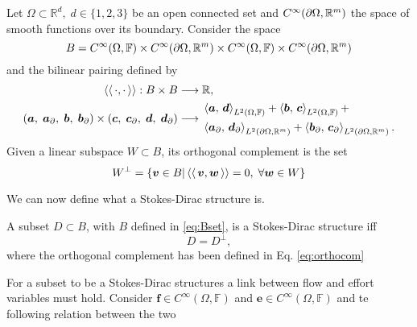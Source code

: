 \begin{definition}
Let $\Omega \subset \mathbb{R}^d, \; d \in \{1,2,3\}$ be an open connected set and $C^\infty(\partial\Omega, \bbR^m)$ the space of smooth functions over its boundary. Consider the space 
\begin{equation}\label{eq:Bset}
B = C^\infty(\Omega, \bbF) \times C^\infty(\partial\Omega, \bbR^m) \times C^\infty(\Omega, \bbF) \times C^\infty(\partial\Omega, \bbR^m)
\end{equation} 
and the bilinear pairing defined by
\begin{equation}\label{eq:bilprod}
\begin{aligned}
\bilprod{\cdot}{\cdot}: B \times B &\longrightarrow \bbR, \\
(\bm{a}, \; \bm{a}_\partial, \; \bm{b}, \; \bm{b}_\partial) \times (\bm{c}, \; \bm{c}_\partial, \; \bm{d}, \; \bm{d}_\partial) &\longrightarrow 
\begin{aligned}
&\inner[L^2(\Omega, \mathbb{F})]{\bm{a}}{\bm{d}} + \inner[L^2(\Omega, \mathbb{F})]{\bm{b}}{\bm{c}} + \\
&\inner[L^2(\partial\Omega, \bbR^m)]{\bm{a}_\partial}{\bm{d}_\partial} +\inner[L^2(\partial\Omega, \bbR^m)]{\bm{b}_\partial}{\bm{c}_\partial}.
\end{aligned}
\end{aligned}
\end{equation}
Given a linear subspace $W \subset B$, its orthogonal complement is the set
\begin{equation}\label{eq:orthocom}
W^\perp = \{\bm{v} \in B \vert \bilprod{\bm{v}}{\bm{w}} = 0, \;  \forall \bm{w} \in W\}
\end{equation}
\end{definition} 
We can now define what a Stokes-Dirac structure is.

\begin{definition}
	A subset $D \subset B$, with $B$ defined in \eqref{eq:Bset}, is a Stokes-Dirac structure iff 
	\begin{equation}
	D = D^\perp,
	\end{equation}
	where the orthogonal complement has been defined in Eq. \eqref{eq:orthocom}
\end{definition} 

For a subset to be a Stokes-Dirac structures a link between flow and effort variables must hold.  Consider $\bm{f} \in C^\infty(\Omega, \mathbb{F})$ and $\bm{e} \in C^\infty(\Omega, \mathbb{F})$ and te following relation between the two

